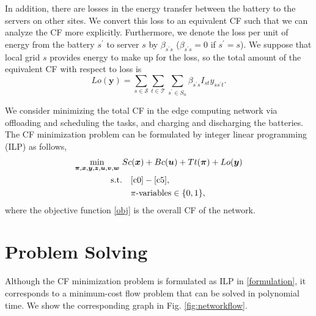 \documentclass[conference, 10pt, ﬁnal, letterpaper, twocolumn]{IEEEtran}
\begin{document}
In addition, there are losses in the energy transfer between the battery to the servers on other sites. We convert this loss to an equivalent CF such that we can analyze the CF more explicitly. Furthermore, we denote the loss per unit of energy from the battery $s^\prime$ to server $s$ by $\beta_{s^\prime s}$ ($\beta_{s^\prime s} = 0$ if $s^\prime = s$). We suppose that local grid $s$ provides energy to make up for the loss, so the total amount of the equivalent CF with respect to loss is 
\begin{equation}\label{lo}
    Lo(\boldsymbol{y}) = \sum_{s \in \mathcal{S}}  \sum_{t \in \mathcal{T}}\sum_{s^\prime \in S_n}  \beta_{s^\prime s} I_{st} y _{ss^\prime t}.
\end{equation}

We consider minimizing the total CF in the edge computing network via offloading and scheduling the tasks, and charging and discharging the batteries. The CF minimization problem can be formulated by integer linear programming (ILP) as follows,
\begin{subequations}\label{formulation}
    \begin{align}
         \mathop{\min}_{\boldsymbol{\pi}, \boldsymbol{x}, \boldsymbol{y}, \boldsymbol{z}, \boldsymbol{u}, \boldsymbol{v}, \boldsymbol{w}} \ &Sc(\boldsymbol{x}) +  Bc(\boldsymbol{u}) + Tt(\boldsymbol{\pi}) + Lo(\boldsymbol{y}) \label{obj}\\
         \text{s.t.} & \quad \eqref{c0} - \eqref{c5},\notag\\
         & \quad \pi\text{-variables} \in \{0,1\},
    \end{align}
\end{subequations}
where the objective function \eqref{obj} is the overall CF of the network.

\section{Problem Solving} 

% 
% 


Although the CF minimization problem is formulated as ILP in \eqref{formulation}, it corresponds to a minimum-cost flow problem that can be solved in polynomial time. We show the corresponding graph in Fig. \ref{fig:networkflow}.
\end{document}
